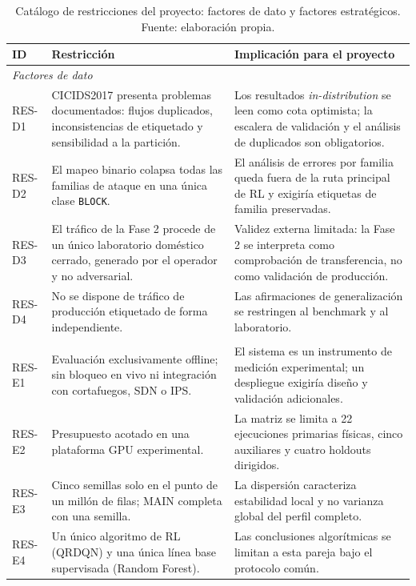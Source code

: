 \begin{table}[htbp]
\centering
\footnotesize
\begin{tabular}{lp{5.4cm}p{5.6cm}}
\toprule
ID & Restricción & Implicación para el proyecto \\
\midrule
\multicolumn{3}{l}{\textit{Factores de dato}} \\
\addlinespace
RES-D1 & CICIDS2017 presenta problemas documentados: flujos duplicados, inconsistencias de etiquetado y sensibilidad a la partición. & Los resultados \emph{in-distribution} se leen como cota optimista; la escalera de validación y el análisis de duplicados son obligatorios. \\
RES-D2 & El mapeo binario colapsa todas las familias de ataque en una única clase \texttt{BLOCK}. & El análisis de errores por familia queda fuera de la ruta principal de RL y exigiría etiquetas de familia preservadas. \\
RES-D3 & El tráfico de la Fase 2 procede de un único laboratorio doméstico cerrado, generado por el operador y no adversarial. & Validez externa limitada: la Fase 2 se interpreta como comprobación de transferencia, no como validación de producción. \\
RES-D4 & No se dispone de tráfico de producción etiquetado de forma independiente. & Las afirmaciones de generalización se restringen al benchmark y al laboratorio. \\
\addlinespace
\multicolumn{3}{l}{\textit{Factores estratégicos}} \\
\addlinespace
RES-E1 & Evaluación exclusivamente offline; sin bloqueo en vivo ni integración con cortafuegos, SDN o IPS. & El sistema es un instrumento de medición experimental; un despliegue exigiría diseño y validación adicionales. \\
RES-E2 & Presupuesto acotado en una plataforma GPU experimental. & La matriz se limita a 22 ejecuciones primarias físicas, cinco auxiliares y cuatro holdouts dirigidos. \\
RES-E3 & Cinco semillas solo en el punto de un millón de filas; MAIN completa con una semilla. & La dispersión caracteriza estabilidad local y no varianza global del perfil completo. \\
RES-E4 & Un único algoritmo de RL (QRDQN) y una única línea base supervisada (Random Forest). & Las conclusiones algorítmicas se limitan a esta pareja bajo el protocolo común. \\
\bottomrule
\end{tabular}
\caption[Catálogo de restricciones del proyecto]{Catálogo de restricciones del proyecto: factores de dato y factores estratégicos. Fuente: elaboración propia.}
\label{tab:restricciones}
\end{table}

